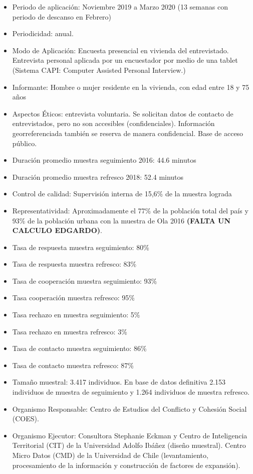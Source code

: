 \documentclass[
]{book}
\begin{document}
\begin{itemize}
\item
  Periodo de aplicación: Noviembre 2019 a Marzo 2020 (13 semanas con periodo de descanso en Febrero)
\item
  Periodicidad: anual.
\item
  Modo de Aplicación: Encuesta presencial en vivienda del entrevistado. Entrevista personal aplicada por un encuestador por medio de una tablet (Sistema CAPI: Computer Assisted Personal Interview.)
\item
  Informante: Hombre o mujer residente en la vivienda, con edad entre 18 y 75 años
\item
  Aspectos Éticos: entrevista voluntaria. Se solicitan datos de contacto de entrevistados, pero no son accesibles (confidenciales). Información georreferenciada también se reserva de manera confidencial. Base de acceso público.
\item
  Duración promedio muestra seguimiento 2016: 44.6 minutos
\item
  Duración promedio muestra refresco 2018: 52.4 minutos
\item
  Control de calidad: Supervisión interna de 15,6\% de la muestra lograda
\item
  Representatividad: Aproximadamente el 77\% de la población total del país y 93\% de la población urbana con la muestra de Ola 2016 \textbf{(FALTA UN CALCULO EDGARDO)}.
\item
  Tasa de respuesta muestra seguimiento: 80\%
\item
  Tasa de respuesta muestra refresco: 83\%
\item
  Tasa de cooperación muestra seguimiento: 93\%
\item
  Tasa cooperación muestra refresco: 95\%
\item
  Tasa rechazo en muestra seguimiento: 5\%
\item
  Tasa rechazo en muestra refresco: 3\%
\item
  Tasa de contacto muestra seguimiento: 86\%
\item
  Tasa de contacto muestra refresco: 87\%
\item
  Tamaño muestral: 3.417 individuos. En base de datos definitiva 2.153 individuos de muestra de seguimiento y 1.264 individuos de muestra refresco.
\item
  Organismo Responsable: Centro de Estudios del Conflicto y Cohesión Social (COES).
\item
  Organismo Ejecutor: Consultora Stephanie Eckman y Centro de Inteligencia Territorial (CIT) de la Universidad Adolfo Ibáñez (diseño muestral). Centro Micro Datos (CMD) de la Universidad de Chile (levantamiento, procesamiento de la información y construcción de factores de expansión).
\end{itemize}
\end{document}
